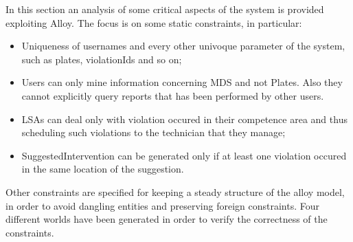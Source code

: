 In this	section an analysis of some critical aspects of the system is provided exploiting Alloy.	
The	focus is on	some static	constraints, in	particular:	
\begin{itemize}
    \item Uniqueness of usernames and every other univoque parameter of the system, such as plates, violationIds and so on;
    \item Users can only mine information concerning MDS and not Plates. Also they cannot explicitly query reports that has been performed by other users.
    \item LSAs can deal only with violation occured in their competence area and thus scheduling such violations to the technician that they manage;
    \item SuggestedIntervention can be generated only if at least one violation occured in the same location of the suggestion.
\end{itemize}
Other constraints are specified for keeping a steady structure of the alloy model, in order to avoid dangling entities and preserving foreign constraints.\newline
Four different worlds have been generated in order to verify the correctness of the constraints.